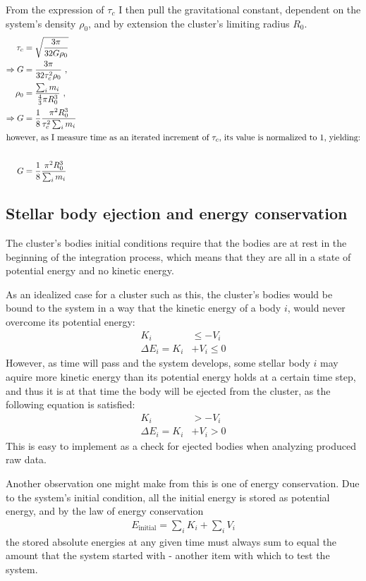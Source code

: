 \documentclass[11pt,a4paper,notitlepage,twocolumn]{article}
\begin{document}
From the expression of $\tau_c$ I then pull the gravitational constant, dependent on the system's density $\rho_0$, and by extension the cluster's limiting radius $R_0$.
\begin{align}\label{eq:tauc_and_G}
\tau_c &= \sqrt{\frac{3\pi}{32G\rho_0}} \nonumber \\
\Rightarrow G &= \frac{3\pi}{32\tau_c^2\rho_0}\ , \nonumber \\
\rho_0 &= \frac{\sum_{i} m_i}{\frac{4}{3}\pi R_0^3}\ , \nonumber \\
\Rightarrow G &= \frac{1}{8}\frac{\pi^2 R_0^3}{\tau_c^2 \sum_{i} m_i}\nonumber \\
\intertext{however, as I measure time as an iterated increment of $\tau_c$, its value is normalized to 1, yielding:}\nonumber \\
G &= \frac{1}{8}\frac{\pi^2 R_0^3}{\sum_{i} m_i}
\end{align}

\subsection{Stellar body ejection and energy conservation}
The cluster's bodies initial conditions require that the bodies are at rest in the beginning of the integration process, which means that they are all in a state of potential energy and no kinetic energy.

As an idealized case for a cluster such as this, the cluster's bodies would be bound to the system in a way that the kinetic energy of a body $i$, would never overcome its potential energy:
\begin{align}
K_i &\leq -V_i \nonumber \\
\Delta E_i = K_i &+ V_i \leq 0
\end{align}
However, as time will pass and the system develops, some stellar body $i$ may aquire more kinetic energy than its potential energy holds at a certain time step, and thus it is at that time the body will be ejected from the cluster, as the following equation is satisfied:
\begin{align}
K_i &> -V_i \nonumber \\
\Delta E_i = K_i &+ V_i > 0 \label{eq:ejection}
\end{align}
This is easy to implement as a check for ejected bodies when analyzing produced raw data.

Another observation one might make from this is one of energy conservation. Due to the system's initial condition, all the initial energy is stored as potential energy, and by the law of energy conservation
\begin{align}
E_{\text{initial}} = \sum_i K_i + \sum_i V_i
\end{align}
the stored absolute energies at any given time must always sum to equal the amount that the system started with - another item with which to test the system.
\end{document}
